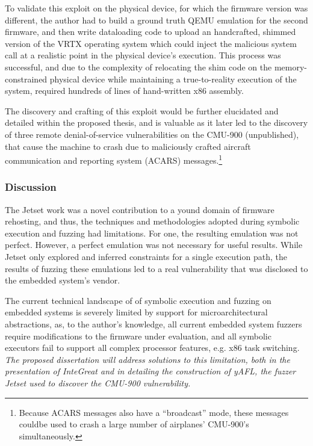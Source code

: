 To validate this exploit on the physical device, for which the firmware version was different, the author had to build a ground truth QEMU emulation for the second firmware, and then write dataloading code to upload an handcrafted, shimmed version of the VRTX operating system which could inject the malicious system call at a realistic point in the physical device's execution.
This process was successful, and due to the complexity of relocating the shim code on the memory-constrained physical device while maintaining a true-to-reality execution of the system, required hundreds of lines of hand-written x86 assembly.

The discovery and crafting of this exploit would be further elucidated and detailed within the proposed thesis, and is valuable as it later led to the discovery of three remote denial-of-service vulnerabilities on the CMU-900 (unpublished), that cause the machine to crash due to maliciously crafted aircraft communication and reporting system (ACARS) messages.\footnote{Because ACARS messages also have a ``broadcast'' mode, these messages couldbe used to crash a large number of airplanes' CMU-900's simultaneously.}

\subsubsection{Discussion}

The Jetset work was a novel contribution to a yound domain of firmware rehosting, and thus, the techniques and methodologies adopted during symbolic execution and fuzzing had limitations. 
For one, the resulting emulation was not perfect.
However, a perfect emulation was not necessary for useful results.
While Jetset only explored and inferred constraints for a single execution path, the results of fuzzing these emulations led to a real vulnerability that was disclosed to the embedded system's vendor.

The current technical landscape of of symbolic execution and fuzzing on embedded systems is severely limited by support for microarchitectural abstractions, as, to the author's knowledge, all current embedded system fuzzers require modifications to the firmware under evaluation, and all symbolic executors fail to support all complex processor features, e.g. x86 task switching.
\emph{The proposed dissertation will address solutions to this limitation, both in the presentation of InteGreat and in detailing the construction of yAFL, the fuzzer Jetset used to discover the CMU-900 vulnerability.}

